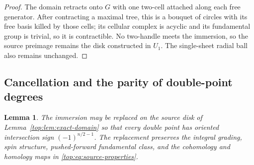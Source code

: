 \documentclass[11pt]{article}
\numberwithin{equation}{section}
\newtheorem{lemma}[theorem]{Lemma}
\theoremstyle{definition}
\theoremstyle{remark}
\begin{document}
\begin{proof}
The domain retracts onto $G$ with one two-cell attached along
each free generator.  After contracting a maximal tree, this
is a bouquet of circles with its free basis killed by those
cells; its cellular complex is acyclic and its fundamental
group is trivial, so it is contractible.  No two-handle meets
the immersion, so the source preimage remains the disk
constructed in $U_1$.  The single-sheet radial ball also
remains unchanged.
\end{proof}

\subsection{Cancellation and the parity of double-point degrees}

\begin{lemma}\label{top:lem:odd-doubles}
The immersion may be replaced on the source disk of
Lemma~\ref{top:lem:exact-domain} so that every double point has
oriented intersection sign $(-1)^{n/2-1}$.  The replacement
preserves the integral grading, spin structure, pushed-forward
fundamental class, and the cohomology and homology maps in
\eqref{top:eq:source-properties}.
\end{lemma}
\end{document}
